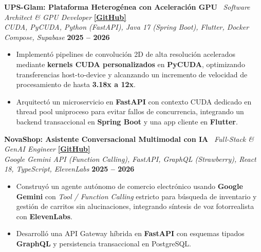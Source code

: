 \documentclass[9.5pt, letterpaper]{article}
\begin{document}
\vspace{2.5pt}

\noindent
\textbf{UPS-Glam: Plataforma Heterogénea con Aceleración GPU} \textbar\ \textit{Software Architect \& GPU Developer} \hfill \href{https://github.com/David5Uzhca/UPS-GLAM}{\textbf{[GitHub]}}\\
\textit{CUDA, PyCUDA, Python (FastAPI), Java 17 (Spring Boot), Flutter, Docker Compose, Supabase} \hfill \textbf{2025 -- 2026}
\begin{itemize}
    \item Implementó pipelines de convolución 2D de alta resolución acelerados mediante \textbf{kernels CUDA personalizados} en \textbf{PyCUDA}, optimizando transferencias host-to-device y alcanzando un incremento de velocidad de procesamiento de hasta \textbf{3.18x a 12x}.
    \item Arquitectó un microservicio en \textbf{FastAPI} con contexto CUDA dedicado en thread pool uniproceso para evitar fallos de concurrencia, integrando un backend transaccional en \textbf{Spring Boot} y una app cliente en \textbf{Flutter}.
\end{itemize}

\vspace{2.5pt}

\noindent
\textbf{NovaShop: Asistente Conversacional Multimodal con IA} \textbar\ \textit{Full-Stack \& GenAI Engineer} \hfill \href{https://github.com/David5Uzhca/ai_shopping_assistant}{\textbf{[GitHub]}}\\
\textit{Google Gemini API (Function Calling), FastAPI, GraphQL (Strawberry), React 18, TypeScript, ElevenLabs} \hfill \textbf{2025 -- 2026}
\begin{itemize}
    \item Construyó un agente autónomo de comercio electrónico usando \textbf{Google Gemini} con \textit{Tool / Function Calling} estricto para búsqueda de inventario y gestión de carritos sin alucinaciones, integrando síntesis de voz fotorrealista con \textbf{ElevenLabs}.
    \item Desarrolló una API Gateway híbrida en \textbf{FastAPI} con esquemas tipados \textbf{GraphQL} y persistencia transaccional en PostgreSQL.
\end{itemize}

\vspace{2.5pt}
\end{document}
